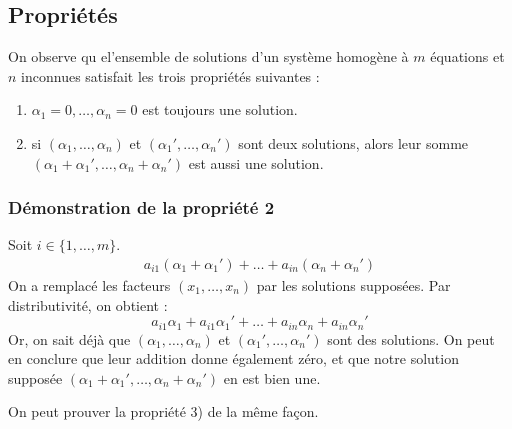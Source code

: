 \documentclass[12pt]{article}
\begin{document}
\pagebreak
\subsection{Propriétés}
On observe qu el'ensemble de solutions d'un système homogène à $m$ équations et $n$ inconnues satisfait les trois propriétés suivantes :
\begin{enumerate}
    \item $\alpha_1 = 0, \dots, \alpha_n = 0$ est toujours une solution.
    \item si $(\alpha_1, \dots, \alpha_n)$ et $(\alpha_1', \dots, \alpha_n')$ 
    sont deux solutions, alors leur somme $(\alpha_1+\alpha_1', \dots, \alpha_n+\alpha_n')$ est aussi une solution.
\end{enumerate}
\subsubsection{Démonstration de la propriété 2}
Soit $i \in \{1, \dots, m\}$.
$$\begin{aligned}
a_{i1}(\alpha_1+\alpha_1') + \dots + a_{in}(\alpha_n+\alpha_n')
\end{aligned}
$$
On a remplacé les facteurs $(x_1, \dots, x_n)$ par les solutions supposées.
Par distributivité, on obtient :
$$
a_{i1}\alpha_1 + a_{i1}\alpha_1' + \dots + a_{in}\alpha_n + a_{in}\alpha_n'
$$
Or, on sait déjà que $(\alpha_1, \dots, \alpha_n)$ et $(\alpha_1', \dots, \alpha_n')$ sont des solutions. On peut en conclure que leur addition donne également zéro, et que notre solution supposée $(\alpha_1 + \alpha_1', \dots, \alpha_n + \alpha_n')$ en est bien une.

On peut prouver la propriété 3) de la même façon.
\end{document}
